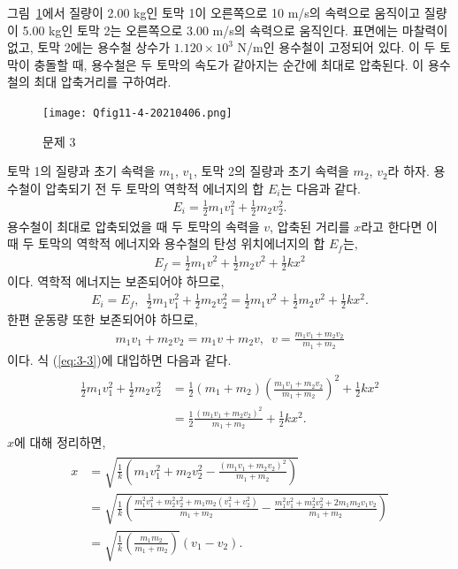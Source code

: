 \documentclass[floatfix,nofootinbib,superscriptaddress,fleqn]{revtex4-2}
\begin{document}
그림~\ref{fig:3}에서 질량이 2.00 kg인 토막 1이 오른쪽으로 10 m/s의
속력으로 움직이고 질량이 5.00 kg인 토막 2는 오른쪽으로 3.00 m/s의
속력으로 움직인다. 표면에는 마찰력이 없고, 토막 2에는 용수철 상수가
$1.120\times 10^3$ N/m인 용수철이 고정되어 있다. 이 두 토막이 충돌할
때, 용수철은 두 토막의 속도가 같아지는 순간에 최대로
압축된다. 이 용수철의 최대 압축거리를 구하여라. 
\begin{figure}[ht]
  \centering
   \texttt{[image: Qfig11-4-20210406.png]}
  \caption{문제 3}
  \label{fig:3}
\end{figure}

 토막 1의 질량과 초기 속력을 $m_1$, $v_1$,
토막 2의 질량과 초기 속력을 $m_2$, $v_2$라 하자. 용수철이 압축되기 전 
두 토막의 역학적 에너지의 합 $E_i$는 다음과 같다.
\begin{align}\label{eq:3-1}
  E_i = \frac{1}{2}m_1v_1^2+\frac{1}{2}m_2v_2^2.
\end{align}
용수철이 최대로 압축되었을 때 두 토막의 속력을 $v$, 압축된 거리를 $x$라고 
한다면 이 때 두 토막의 역학적 에너지와 용수철의 탄성 위치에너지의 합 $E_f$는,
\begin{align}\label{eq:3-2}
  E_f = \frac{1}{2}m_1v^2+\frac{1}{2}m_2v^2+\frac{1}{2}kx^2
\end{align}
이다. 역학적 에너지는 보존되어야 하므로,
\begin{align}\label{eq:3-3}
  E_i = E_f,\,\,\,\frac{1}{2}m_1v_1^2+\frac{1}{2}m_2v_2^2
  = \frac{1}{2}m_1v^2+\frac{1}{2}m_2v^2+\frac{1}{2}kx^2.
\end{align}
한편 운동량 또한 보존되어야 하므로,
\begin{align}\label{eq:3-4}
  m_1v_1+m_2v_2 = m_1v+m_2v,\,\,\,v=\frac{m_1v_1+m_2v_2}{m_1+m_2}
\end{align}
이다. 식 (\ref{eq:3-3})에 대입하면 다음과 같다.
\begin{align}
  \begin{split}
    \frac{1}{2}m_1v_1^2+\frac{1}{2}m_2v_2^2
    &= \frac{1}{2}(m_1+m_2){\left(\frac{m_1v_1+m_2v_2}{m_1+m_2}\right)}^2
    +\frac{1}{2}kx^2  \\
    &=\frac{1}{2}\frac{(m_1v_1+m_2v_2)^2}{m_1+m_2}
    +\frac{1}{2}kx^2.
  \end{split}
\end{align}
$x$에 대해 정리하면,
\begin{align}
  \begin{split}
    x &= \sqrt{\frac{1}{k}\left(
      m_1v_1^2+m_2v_2^2-\frac{(m_1v_1+m_2v_2)^2}{m_1+m_2}
      \right)}  \\
      &= \sqrt{\frac{1}{k}\left(
        \frac{m_1^2v_1^2+m_2^2v_2^2+m_1m_2(v_1^2+v_2^2)}{m_1+m_2}
        -\frac{m_1^2v_1^2+m_2^2v_2^2+2m_1m_2v_1v_2}{m_1+m_2}
        \right)}  \\
        &=\sqrt{\frac{1}{k}\left(
          \frac{m_1m_2}{m_1+m_2}
          \right)}(v_1-v_2).
      \end{split}
\end{align}
\end{document}
